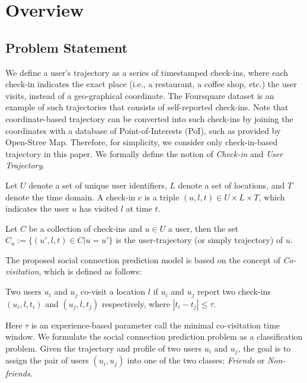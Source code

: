\section{Overview} \label{sec:overview}

\subsection{Problem Statement} \label{sec:problem}

We define a user's trajectory as a series of timestamped check-ins, where each check-in indicates the exact place (i.e., a restaurant, a coffee shop, etc.) the user visits, instead of a geo-graphical coordinate. The Foursquare dataset is an example of such trajectories that consists of self-reported check-ins. Note that coordinate-based trajectory can be converted into such check-ins by joining the coordinates with a database of Point-of-Interests (PoI), such as provided by Open-Stree Map. Therefore, for simplicity, we consider only check-in-based trajectory in this paper. We formally define the notion of \textit{Check-in} and \textit{User Trajectory}.

\begin{definition}[Check-in]
Let $U$ denote a set of unique user identifiers, $L$ denote a set of locations, and $T$ denote the time domain. A check-in $c$ is a triple $(u, l, t) \in U \times L \times T$, which indicates the user $u$ has visited $l$ at time $t$.
\end{definition}

\begin{definition}
Let $C$ be a collection of check-ins and $u \in U$ a user, then the set $C_u := \{ (u', l, t) \in C | u = u'\}$ is the user-trajectory (or simply trajectory) of $u$.
\end{definition}

The proposed social connection prediction model is based on the concept of \textit{Co-visitation}, which is defined as follows: 

\begin{definition}[Co-visitation]
Two users $u_i$ and $u_j$ co-visit a location $l$ if $u_i$ and $u_j$ report two check-ins $(u_i, l, t_i)$ and $(u_j, l, t_j)$ respectively, where $| t_i - t_j| \leq \tau$.
\end{definition}

Here $\tau$ is an experience-based parameter call the minimal co-visitation time window. We formulate the social connection prediction problem as a classification problem. Given the trajectory and profile of two users $u_i$ and $u_j$, the goal is to assign the pair of users $(u_i, u_j)$ into one of the two classes: \textit{Friends} or \textit{Non-friends}. 

